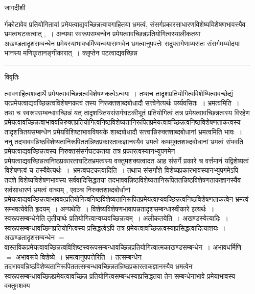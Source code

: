 \documentclass[10pt, openany]{book}
\begin{document}
{\newpage
\begin{center} जागदीशी \end{center}
{\la र्गकोटावेव प्रतियोगितायां प्रमेयत्वाद्यवच्छिन्नत्वावगाहितया भ्रमत्वं, संसर्गप्रकारसाधारणविशेष्यविशेषणभावस्यैव भ्रमत्वघटकत्वात् ,~। अन्यथा स्वरूपसम्बन्धेन प्रमेयत्वावच्छिन्नप्रतियोगित्वस्यालीकतया अखण्डतादृशसम्बन्धेन प्रमेयस्याभावधर्मिण्यन्वयासम्भवेन भ्रमत्वानुपपत्तेः सदुपरागेणाप्यसतः संसर्गमर्य्यादया भानस्य मणिकृतानङ्गीकारात्~। क्लृप्तेन पटत्वाद्यवच्छिन्न}\\
\hrule
\begin{center}     विवृतिः \end{center}
त्वावगाहित्वशब्दार्थे प्रमेयत्वावच्छिन्नत्वविशेषणकत्वेऽन्वयः~। तथाच तादृशप्रतियोगित्वविशेष्यित्वावच्छेद्यं यत्प्रमेयत्वाद्यवच्छिन्नत्वविशेषणकत्वं तस्य निरूक्तशाब्दबोधादौ सत्त्वेनेत्यर्थः पर्य्यवसितः~। भ्रमत्वमिति~। तथा च स्वरूपसम्बन्धावच्छिन्नं यत् तादृशत्रितयसंसर्गघटकीभूतं प्रतियोगित्वं तत्र प्रमेयत्वावच्छिन्नत्वस्य विरहेण
प्रमेयत्वावच्छिन्नत्वाभाववन्निरुक्तप्रतियोगित्वनिष्ठविशेष्यतानिरूपितप्रमेयत्वावच्छिन्नत्वनिष्ठविशेषणताकत्वस्य तादृशत्रितयसम्बन्धेन प्रमेयविशिष्टाभावविषयके शाब्दबोधादौ सत्त्वान्निरुक्तशाब्दबोधानां भ्रमत्वमिति भावः~। ननु तदभाववन्निष्ठविशेष्यतानिरूपिततन्निष्ठप्रकारताकज्ञानस्यैव भ्रमत्वे कथमुक्तशाब्दबोधानां भ्रमत्वं संभवति प्रमेयत्वाद्यवच्छिन्नत्वस्य निरुक्तसंसर्गघटकतया तत्र प्रकारत्वस्यानभ्युपगमेन प्रमेयत्वाद्यवच्छिन्नत्वनिष्ठप्रकारताघटितभ्रमत्वस्य वक्तुमशक्यत्वादत आह संसर्गे प्रकारे च वर्त्तमानं यद्विशेष्यत्वं विशेषणत्वं च तस्यैवेत्यर्थः~।~{\la भ्रमत्वघटकत्वादिति~।} तथाच संसर्गांशे विशेष्यप्रकारभावस्यानभ्युपगमेऽपि तदंशे विशेष्यविशेषणभावस्य सर्ववादिसिद्धतया तदभाववन्निष्ठविशेष्यतानिरूपिततन्निष्ठविशेषणताकज्ञानस्यैव सर्वसाधारणं भ्रमत्वं वाच्यम् , एवञ्च निरुक्तशाब्दबोर्धानां
प्रमेयत्वाद्यवच्छिन्नत्वाभाववत्प्रतियोगित्वनिष्ठविशेष्यतानिरूपितप्रमेयत्वाप्यवच्छिन्नत्वनिष्ठविशेषणताकत्वेन भ्रमत्वं सम्भवत्येवेति हृदयम्~। अन्यथेति~।
{\qt विशेष्यविशेषणभावापन्नतादृशसम्बन्धास्वीकारे } इत्यर्थः~। स्वरूपसम्बन्धेनेति तृतीयार्थः प्रतियोगित्वान्वय्यवच्छिन्नत्वम्~। अलीकतयेति~। अखण्डस्येत्यादिः~। स्वरूपसम्बन्धावच्छिनप्रतियोगित्वस्य प्रसिद्धत्वेऽपि तत्र प्रमेयत्वावच्छिन्नत्वस्याप्रसिद्धत्वादित्याशयः~। अखण्डतादृशसम्बन्धेन $=$ वास्तविकप्रमेयत्वावच्छिन्नत्वविशिष्टस्वरूपसम्बन्धावच्छिन्नप्रतियोगित्वात्मकाखण्डसम्बन्धेन~। अभावधर्मिणि $=$ अभावरूपे विशेष्ये~।
{\la भ्रमत्वानुपपत्तेरिति~।} तत्सम्बन्धेन तदभाववन्निष्ठविशेष्यतानिरूपिततत्सम्बन्धावच्छिन्नतन्निष्ठप्रकारताकज्ञानस्यैव भ्रमत्वेन
 स्वरूपसम्बन्धावच्छिन्नप्रमेयत्वावच्छिन्न प्रतियोगित्वसम्बन्धस्याप्रसिद्धतया तेन सम्बन्धेनाभावे प्रमेयाभावस्य वक्तुमशक्य\\
}
\end{document}
